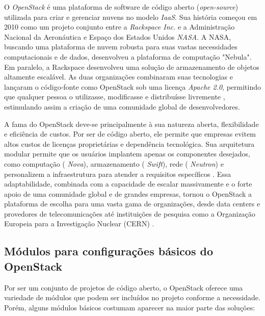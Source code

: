 O  \textit{OpenStack} é uma plataforma de software de código aberto (\textit{open-source}) utilizada para criar e gerenciar nuvens no modelo \textit{IaaS}. Sua história começou em 2010 como um projeto conjunto entre a  \textit{Rackspace Inc.} e a Administração Nacional da Aeronáutica e Espaço dos Estados Unidos \textit{NASA}. A NASA, buscando uma plataforma de nuvem robusta para suas vastas necessidades computacionais e de dados, desenvolveu a plataforma de computação "Nebula". Em paralelo, a Rackspace desenvolveu uma solução de armazenamento de objetos altamente escalável. As duas organizações combinaram suas tecnologias e lançaram o código-fonte como OpenStack sob uma licença  \textit{Apache 2.0}, permitindo que qualquer pessoa o utilizasse, modificasse e distribuísse livremente \cite{nasa2012}, estimulando assim a criação de uma comunidade global de desenvolvedores.

A fama do OpenStack deve-se principalmente à sua natureza aberta, flexibilidade e eficiência de custos. Por ser de código aberto, ele permite que empresas evitem altos custos de licenças proprietárias e dependência tecnológica. Sua arquitetura modular permite que os usuários implantem apenas os componentes desejados, como computação ( \textit{Nova}), armazenamento ( \textit{Swift}), rede ( \textit{Neutron}) e personalizem a infraestrutura para atender a requisitos específicos \cite{grzonka2015}. Essa adaptabilidade, combinada com a capacidade de escalar massivamente e o forte apoio de uma comunidade global e de grandes empresas, tornou o OpenStack a plataforma de escolha para uma vasta gama de organizações, desde data centers e provedores de telecomunicações até instituições de pesquisa como a Organização Europeia para a Investigação Nuclear (CERN) \cite{rousseau2019}.

\subsection{Módulos para configurações básicos do OpenStack}

Por ser um conjunto de projetos de código aberto, o OpenStack oferece uma variedade de módulos que podem ser incluídos no projeto conforme a necessidade. Porém, alguns módulos básicos costumam aparecer na maior parte das soluções:


